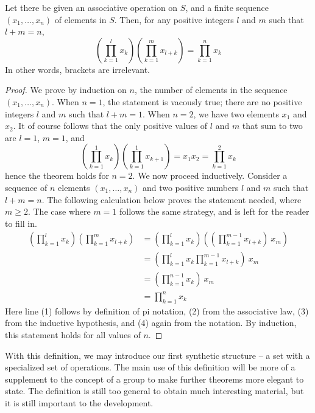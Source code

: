 \begin{theorem}
Let there be given an associative operation on $S$, and a finite sequence $(x_1, \dots, x_n)$ of elements in $S$. Then, for any positive integers $l$ and $m$ such that $l + m = n$,
%
\[ \left( \prod_{k=1}^l x_k \right) \left( \prod_{k=1}^m x_{l + k} \right) = \prod_{k=1}^n x_k \]
%
In other words, brackets are irrelevant.
\end{theorem}
\begin{proof}
    We prove by induction on $n$, the number of elements in the sequence $(x_1, \dots, x_n)$. When $n = 1$, the statement is vacously true; there are no positive integers $l$ and $m$ such that $l + m = 1$. When $n = 2$, we have two elements $x_1$ and $x_2$. It of course follows that the only positive values of $l$ and $m$ that sum to two are $l = 1$, $m = 1$, and
    \[ \left( \prod_{k=1}^1 x_k \right) \left( \prod_{k=1}^1 x_{k+1} \right) = x_1 x_2 = \prod_{k=1}^2 x_k \]
    hence the theorem holds for $n = 2$. We now proceed inductively. Consider a sequence of $n$ elements $(x_1, \dots, x_n)$ and two positive numbers $l$ and $m$ such that $l + m = n$. The following calculation below proves the statement needed, where $m \geq 2$. The case where $m = 1$ follows the same strategy, and is left for the reader to fill in.
    \begin{align*}
        \left( \prod_{k=1}^l x_k \right) \left( \prod_{k=1}^m x_{l + k} \right) &= \left( \prod_{k=1}^l x_k \right) \left( \left( \prod_{k=1}^{m-1} x_{l + k} \right)\ x_m \right)\\
        &= \left( \prod_{k=1}^l x_k \prod_{k=1}^{m-1} x_{l + k} \right)\ x_m\\
        &= \left( \prod_{k=1}^{n-1} x_k \right)\ x_m\\
        &= \prod_{k=1}^n x_k
    \end{align*}
    Here line (1) follows by definition of pi notation, (2) from the associative law, (3) from the inductive hypothesis, and (4) again from the notation. By induction, this statement holds for all values of $n$.
\end{proof}

With this definition, we may introduce our first synthetic structure -- a set with a specialized set of operations. The main use of this definition will be more of a supplement to the concept of a group to make further theorems more elegant to state. The definition is still too general to obtain much interesting material, but it is still important to the development.

